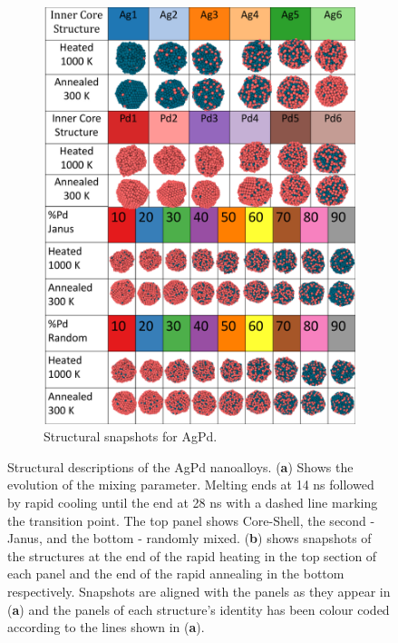 \begin{figure}
\begin{subfigure}{0.39\textwidth}
\end{subfigure}
\begin{subfigure}{0.56\textwidth}
    \includegraphics[width=\linewidth]{figures/MD/Alloys/AgPd_Struts.pdf}
    \caption{Structural snapshots for AgPd.}
    \label{fig:AgPd_Struts}
\end{subfigure}
    \caption{Structural descriptions of the AgPd nanoalloys. (\textbf{a}) Shows the evolution of the mixing parameter. Melting ends at 14 ns followed by rapid cooling until the end at 28 ns with a dashed line marking the transition point. The top panel shows Core-Shell, the second - Janus, and the bottom - randomly mixed. (\textbf{b}) shows snapshots of the structures at the end of the rapid heating in the top section of each panel and the end of the rapid annealing in the bottom respectively. Snapshots are aligned with the panels as they appear in (\textbf{a}) and the panels of each structure's identity has been colour coded according to the lines shown in (\textbf{a}).}
    \label{fig:AgPd_NA}
\end{figure}


